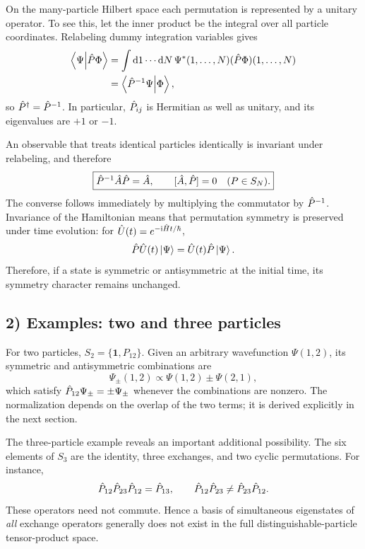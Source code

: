 On the many-particle Hilbert space each permutation is represented by a unitary operator. To see this, let the inner product be the integral over all particle coordinates. Relabeling dummy integration variables gives
\begin{equation}
\begin{aligned}
\left\langle\Psi\middle|\hat{P}\Phi\right\rangle
 &=\int\mathrm{d} 1\cdots\mathrm{d} N\,\Psi^*(1,\ldots,N)
      (\hat{P}\Phi)(1,\ldots,N)\\
 &=\left\langle\hat{P}^{-1}\Psi\middle|\Phi\right\rangle,
\end{aligned}
\end{equation}
so $\hat{P}^\dagger=\hat{P}^{-1}$. In particular, $\hat{P}_{ij}$ is Hermitian as well as unitary, and its eigenvalues are $+1$ or $-1$.

An observable that treats identical particles identically is invariant under relabeling, and therefore
\begin{equation}
\boxed{\hat{P}^{-1}\hat{A}\hat{P}=\hat{A},
\qquad [\hat{A},\hat{P}]=0\quad(P\in S_N).}
\end{equation}
The converse follows immediately by multiplying the commutator by $\hat{P}^{-1}$. Invariance of the Hamiltonian means that permutation symmetry is preserved under time evolution: for $\hat{U}(t)=e^{-\mathrm{i}\hat{H}t/\hbar}$,
\begin{equation}
\hat{P}\hat{U}(t)\left|\Psi\right\rangle=\hat{U}(t)\hat{P}\left|\Psi\right\rangle.
\end{equation}
Therefore, if a state is symmetric or antisymmetric at the initial time, its symmetry character remains unchanged.

\subsection*{2) Examples: two and three particles}

For two particles, $S_2=\{\mathbf1,P_{12}\}$. Given an arbitrary wavefunction $\Psi(1,2)$, its symmetric and antisymmetric combinations are
\begin{equation}
\Psi_\pm(1,2)\propto\Psi(1,2)\pm\Psi(2,1),
\end{equation}
which satisfy $\hat{P}_{12}\Psi_\pm=\pm\Psi_\pm$ whenever the combinations are nonzero. The normalization depends on the overlap of the two terms; it is derived explicitly in the next section.

The three-particle example reveals an important additional possibility. The six elements of $S_3$ are the identity, three exchanges, and two cyclic permutations. For instance,
\begin{equation}
\hat{P}_{12}\hat{P}_{23}\hat{P}_{12}=\hat{P}_{13},\qquad
\hat{P}_{12}\hat{P}_{23}\ne\hat{P}_{23}\hat{P}_{12}.
\end{equation}
These operators need not commute. Hence a basis of simultaneous eigenstates of \emph{all} exchange operators generally does not exist in the full distinguishable-particle tensor-product space.


